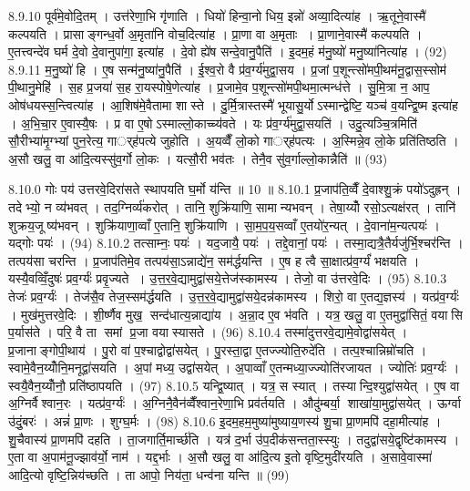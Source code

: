 8.9.10
पूर्व॑मे॒वोदि॒तम् । उत्त॑रेणा॒भि गृ॑णाति । धियो॑ हिन्वा॒नो धिय॒ इन्नो॑ अव्या॒दित्या॑ह । ऋ॒तूने॒वास्मै॑ कल्पयति । प्रासाङ्गन्ध॒र्वो अ॒मृता॑नि वोच॒दित्या॑ह । प्रा॒णा वा अ॒मृताः । प्रा॒णाने॒वास्मै॑ कल्पयति । ए॒तत्त्वन्दे॑व घर्म दे॒वो दे॒वानुपा॑गा॒ इत्या॑ह । दे॒वो ह्ये॑ष सन्दे॒वानु॒पैति॑ । इ॒दम॒हं म॑नु॒ष्यो॑ मनु॒ष्या॑नित्या॑ह । (92)
8.9.11
म॒नु॒ष्यो॑ हि । ए॒ष सन्म॑नु॒ष्या॑नु॒पैति॑ । ई॒श्व॒रो वै प्र॑व॒र्ग्य॑मुद्वा॒सय\sn{} । प्र॒जां प॒शून्त्सो॑मपी॒थम॑नू॒द्वास॒स्सोम॑ पी॒थानु॒मेहि॑ । स॒ह प्र॒जया॑ स॒ह रा॒यस्पोषे॒णेत्या॑ह । प्र॒जामे॒व प॒शून्त्सो॑मपी॒थमा॒त्मन्ध॑त्ते । सु॒मि॒त्रा न॒ आप॒ ओष॑धयस्स॒न्त्वित्या॑ह । आ॒शिष॑मे॒वैतामा शास्ते । दु॒र्मि॒त्रास्तस्मै॑ भूयासु॒र्योऽस्मान्द्वेष्टि॒ यञ्च॑ व॒यन्द्वि॒ष्म इत्या॑ह । अ॒भि॒चा॒र ए॒वास्यै॒षः । प्र वा ए॒षोऽस्माल्लो॒काच्च्य॑वते । यः प्र॑व॒र्ग्य॑मुद्वा॒सयति॑ । उदु॒त्यञ्चि॒त्रमिति॑ सौ॒रीभ्या॑मृ॒ग्भ्यां पुन॒रेत्य॒ गार््ह॑पत्ये जुहोति । अ॒यव्वैँ लो॒को गार््ह॑पत्यः । अ॒स्मिन्ने॒व लो॒के प्रति॑तिष्ठति । अ॒सौ खलु॒ वा आ॑दि॒त्यस्सु॑व॒र्गो लो॒कः । यत्सौ॒री भव॑तः । तेनै॒व सु॑व॒र्गाल्लो॒कान्नैति॑ ॥ (93)
\anuvakamend

8.10.0
गोः पय॑ उत्तरवे॒दिरा॑सते स्थापयति घ॒र्मो य॑न्ति ॥ 10 ॥
8.10.1
प्र॒जाप॑ति॒व्वैँ दे॒वाश्शु॒क्रं पयो॑ऽदुह्रन् । तदेभ्यो॒ न व्य॑भवत् । तद॒ग्निर्व्य॑करोत् । तानि॒ शुक्रि॑याणि॒ सामान्यभवन् । तेषा॒य्योँ रसो॒ऽत्यक्ष॑रत् । तानि॑ शुक्रय॒जूष्य॑भवन् । शुक्रि॑याणा॒व्वाँ ए॒तानि॒ शुक्रि॑याणि । सा॒म॒प॒य॒सव्वाँ ए॒तयो॑र॒न्यत् । दे॒वाना॑म॒न्यत्पयः॑ । यद्गोः पयः॑ । (94)
8.10.2
तत्साम्नः॒ पयः॑ । यद॒जायै॒ पयः॑ । तद्दे॒वानां॒ पयः॑ । तस्मा॒द्यत्रै॒तैर्यजु॑र्भि॒श्चर॑न्ति । तत्पय॑सा चरन्ति । प्र॒जाप॑तिमे॒व तत्पय॑सा॒ऽन्नाद्ये॑न॒ सम॑र्द्धयन्ति । ए॒ष ह त्वै सा॒क्षात्प्र॑व॒र्ग्यं॑ भक्षयति । यस्यै॒वव्विँ॒दुषः॑ प्रव॒र्ग्यः॑ प्रवृ॒ज्यते । उ॒त्त॒र॒वे॒द्यामुद्वा॑सये॒त्तेज॑स्कामस्य । तेजो॒ वा उ॑त्तरवे॒दिः । (95)
8.10.3
तेजः॑ प्रव॒र्ग्यः॑ । तेज॑सै॒व तेज॒स्सम॑र्द्धयति । उ॒त्त॒र॒वे॒द्यामुद्वा॑सये॒दन्न॑कामस्य । शिरो॒ वा ए॒तद्य॒ज्ञस्य॑ । यत्प्र॑व॒र्ग्यः॑ । मुख॑मुत्तरवे॒दिः । शी॒र्ष्णैव मुख॒ सन्द॑धात्य॒न्नाद्या॑य । अ॒न्ना॒द ए॒व भ॑वति । यत्र॒ खलु॒ वा ए॒तमुद्वा॑सितं॒ वयासि प॒र्यास॑ते । परि॒ वै ता समां प्र॒जा वयास्यासते । (96)
8.10.4
तस्मा॑दुत्तरवे॒द्यामे॒वोद्वा॑सयेत् । प्र॒जानाङ्गोपी॒थाय॑ । पु॒रो वा॑ प॒श्चाद्वोद्वा॑सयेत् । पु॒रस्ता॒द्वा ए॒तज्ज्योति॒रुदे॑ति । तत्प॒श्चान्निम्रो॑चति । स्वामे॒वैन॒य्योँनि॒मनूद्वा॑सयति । अ॒पां मध्य॒ उद्वा॑सयेत् । अ॒पाव्वाँ ए॒तन्मध्या॒ज्ज्योति॑रजायत । ज्योतिः॑ प्रव॒र्ग्यः॑ । स्वयै॒वैन॒य्योँनौ॒ प्रति॑ष्ठापयति । (97)
8.10.5
यन्द्वि॒ष्यात् । यत्र॒ स स्यात् । तस्यान्दि॒श्युद्वा॑सयेत् । ए॒ष वा अ॒ग्निर्वैश्वान॒रः । यत्प्र॑व॒र्ग्यः॑ । अ॒ग्निनै॒वैन॑व्वैँश्वान॒रेणा॒भि प्रव॑र्तयति । औदु॑म्बर्या॒ शाखा॑या॒मुद्वा॑सयेत् । ऊर्ग्वा उ॑दुं॒बरः॑ । अन्नं॑ प्रा॒णः । शुग्घ॒र्मः । (98)
8.10.6
इ॒दम॒हम॒मुष्या॑मुष्याय॒णस्य॑ शु॒चा प्रा॒णमपि॑ दहा॒मीत्या॑ह । शु॒चैवास्य॑ प्रा॒णमपि॑ दहति । ता॒जगार्ति॒मार्च्छ॑ति । यत्र॑ द॒र्भा उ॑प॒दीक॑सन्तता॒स्स्युः । तदुद्वा॑सये॒द्वृष्टि॑कामस्य । ए॒ता वा अ॒पाम॑नू॒ज्झाव॑र्यो॒ नाम॑ । यद्द॒र्भाः । अ॒सौ खलु॒ वा आ॑दि॒त्य इ॒तो वृष्टि॒मुदी॑रयति । अ॒सावे॒वास्मा॑ आदि॒त्यो वृष्टि॒न्निय॑च्छति । ता आपो॒ निय॑ता॒ धन्व॑ना यन्ति ॥ (99)
\anuvakamend

